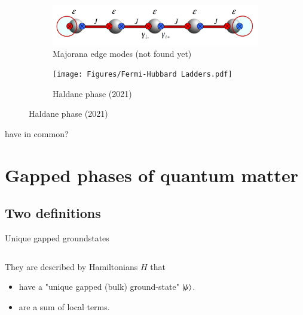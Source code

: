 \documentclass{beamer}
\begin{document}
\begin{frame}
	\begin{figure}
		\centering
		\begin{subfigure}[b]{0.4\textwidth}
			\centering
			\includegraphics[width=\textwidth]{Figures/MajoranaEdgeModes.png}
			\caption{Majorana edge modes (not found yet)}
		\end{subfigure}
		\hfill
		\begin{subfigure}[b]{0.4\textwidth}
			\centering
			\texttt{[image: Figures/Fermi-Hubbard Ladders.pdf]}
			\caption{Haldane phase (2021)}
		\end{subfigure}
	\end{figure}
	have in common?
\end{frame}

\section{Gapped phases of quantum matter}
\subsection{Two definitions}

\begin{frame}{Unique gapped groundstates}
	\begin{columns}
		\begin{column}{0.7\textwidth}
			They are described by Hamiltonians $H$ that
			\begin{itemize}
				\item<2-> have a "unique gapped (bulk) ground-state" $\ket{\psi}$.
				\item<3-> are a sum of local terms.
			\end{itemize}
		\end{column}
		\begin{column}{0.3\textwidth}
			\begin{center}
				
			\end{center}
		\end{column}
	\end{columns}
	
\end{frame}
\end{document}
